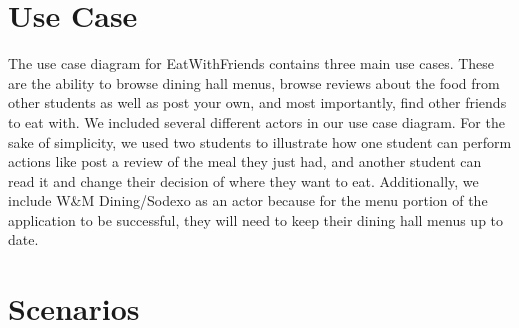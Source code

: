 \documentclass[5pt]{article} %
\begin{document}
\section{Use Case}


\begin{flushleft}
The use case diagram for EatWithFriends contains three main use cases.  These are the ability to browse dining hall menus, browse reviews about the food from other students as well as post your own, and most importantly, find other friends to eat with.  We included several different actors in our use case diagram.  For the sake of simplicity, we used two students to illustrate how one student can perform actions like post a review of the meal they just had, and another student can read it and change their decision of where they want to eat.  Additionally, we include W\&M Dining/Sodexo as an actor because for the menu portion of the application to be successful, they will need to keep their dining hall menus up to date.
\end{flushleft}

\section{Scenarios}
\end{document}
